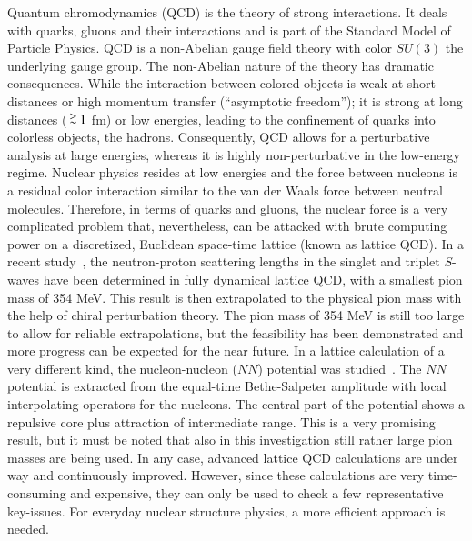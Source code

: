 \documentclass[sort&compress,preprint,3p]{elsarticle}
\newcommand{\gea}{\raisebox{-.3ex}{\small $ \
\stackrel{\textstyle >}{\sim} $ }}
\begin{document}
Quantum chromodynamics (QCD) is the theory of strong interactions.
It deals with quarks, gluons and their interactions and is
part of the Standard Model of Particle Physics.
QCD is a non-Abelian gauge field theory
with color $SU(3)$ the underlying gauge group.
The non-Abelian nature of the theory has dramatic
consequences. While 
the interaction between colored objects is weak 
at short distances or high momentum transfer
(``asymptotic freedom'');
it is strong at long distances ($\gea 1$ fm) or low energies,
leading to the confinement of quarks into colorless
objects, the hadrons. Consequently, QCD allows for a 
perturbative analysis at large energies, whereas it is
highly non-perturbative in the low-energy regime.
Nuclear physics resides at low energies and
the force between nucleons is
a residual color interaction
similar to the van der Waals force between neutral molecules.
Therefore, in terms of quarks and gluons, the nuclear force
is a very complicated problem that, nevertheless, can be attacked
with brute computing power on a discretized, Euclidean space-time lattice
(known as lattice QCD). In a recent study~\cite{Bea06}, the neutron-proton scattering lengths
in the singlet and triplet $S$-waves have been determined in fully dynamical
lattice QCD, with a smallest pion mass of 354 MeV. This result is then extrapolated
to the physical pion mass with the help of chiral perturbation theory. The pion mass
of 354 MeV is still too large to allow for reliable extrapolations, but the feasibility has been
demonstrated and more progress can be expected for the near future.
In a lattice calculation of a very different kind, the nucleon-nucleon ($NN$) potential
was studied~\cite{IAH07,Ino10}.
The $NN$ potential is extracted from the equal-time Bethe-Salpeter
amplitude with local interpolating operators for the nucleons. The central part of the
potential shows a repulsive core plus attraction of intermediate range. This is a very promising
result, but it must be noted that also in this investigation still rather large pion masses are being used.
In any case, advanced lattice QCD calculations are under way and continuously improved. 
However, since these calculations are very time-consuming
and expensive, they can only be used to check a few representative key-issues. For everyday
nuclear structure physics, a more efficient approach is needed. 
\end{document}

